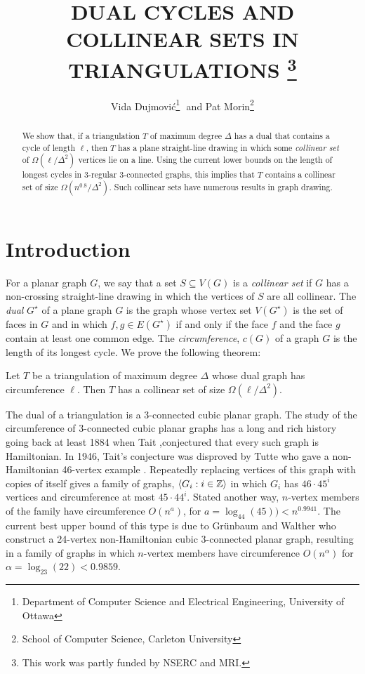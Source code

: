 \documentclass{patmorin}
\title{\MakeUppercase{Dual Cycles and Collinear Sets in Triangulations}%
    \thanks{This work was partly funded by NSERC and MRI.}}
\author{Vida Dujmovi\'c\thanks{Department of Computer Science and Electrical Engineering, University of Ottawa}\,\, and 
        Pat Morin\thanks{School of Computer Science, Carleton University}}
\newcommand{\dual}[1]{{#1}^\star}
\begin{document}
\maketitle


\begin{abstract}
   We show that, if a triangulation $T$ of maximum degree $\Delta$
   has a dual that contains a cycle of length $\ell$, then $T$ has
   a plane straight-line drawing in which some \emph{collinear set}
   of $\Omega(\ell/\Delta^2)$ vertices lie on a line.  Using the
   current lower bounds on the length of longest cycles in 3-regular
   3-connected graphs, this implies that $T$ contains a collinear set
   of size $\Omega(n^{0.8}/\Delta^2)$.  Such collinear sets have numerous
   results in graph drawing.
\end{abstract}

\section{Introduction}

For a planar graph $G$, we say that a set $S\subseteq V(G)$ is
a \emph{collinear set} if $G$ has a non-crossing straight-line drawing in
which the vertices of $S$ are all collinear.  The \emph{dual} $\dual{G}$
of a plane graph $G$ is the graph whose vertex set $V(\dual{G})$ is
the set of faces in $G$ and in which $f,g\in E(\dual{G})$ if and only
if the face $f$ and the face $g$ contain at least one common edge.
The \emph{circumference}, $c(G)$ of a graph $G$ is the length of its
longest cycle. We prove the following theorem:

\begin{thm}
  Let $T$ be a triangulation of maximum degree $\Delta$ whose dual graph
  has circumference $\ell$. Then $T$ has a collinear set of
  size $\Omega(\ell/\Delta^2)$.
\end{thm}

The dual of a triangulation is a 3-connected cubic planar graph.
The study of the circumference of 3-connected cubic planar graphs
has a long and rich history going back at least 1884 when Tait
\cite{tait:listings},conjectured that every such graph is Hamiltonian.  In
1946, Tait's conjecture was disproved by Tutte who gave a non-Hamiltonian
46-vertex example \cite{tutte:on}.  Repeatedly replacing vertices of
this graph with copies of itself gives a family of graphs, $\langle G_i:i\in
\mathbb{Z}\rangle$ in which $G_i$ has $46\cdot 45^i$ vertices and circumference at
most $45\cdot44^i$.  Stated another way, $n$-vertex members of the
family have circumference $O(n^a)$, for $a=\log_{44}(45)) < n^{0.9941}$.
The current best upper bound of this type is due to Gr\"unbaum and
Walther \cite{grunbaum.walther:shortness} who construct a 24-vertex
non-Hamiltonian cubic 3-connected planar graph, resulting in a family
of graphs in which $n$-vertex members have circumference $O(n^{\alpha})$
for $\alpha=\log_{23}(22)< 0.9859$.
\end{document}
